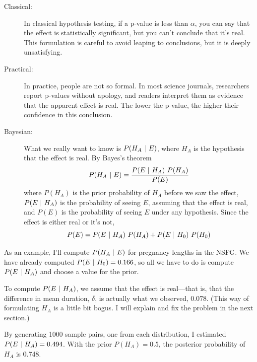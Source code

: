 \documentclass[12pt]{book}
\begin{document}
\begin{description}

\item[Classical:] In classical hypothesis testing, if a p-value
  is less than $\alpha$, you can say that the effect is statistically
  significant, but you can't conclude that it's real.  This
  formulation is careful to avoid leaping to conclusions, but it is
  deeply unsatisfying.

\item[Practical:] In practice, people are not so formal.  In most
  science journals, researchers report p-values without apology, and
  readers interpret them as evidence that the apparent effect is real.
  The lower the p-value, the higher their confidence in this
  conclusion.


\item[Bayesian:] What we really want to know is $P(H_A ~|~ E)$, where
  $H_A$ is the hypothesis that the effect is real.  By Bayes's theorem
  \[ P(H_A ~|~ E) = \frac{P(E ~|~ H_A) ~ P(H_A)}{P(E)} \]
  where $P(H_A)$ is the prior probability of $H_A$ before we saw the
  effect, $P(E ~|~ H_A)$ is the probability of seeing $E$, assuming that
  the effect is real, and $P(E)$ is the probability of seeing $E$
  under any hypothesis.  Since the effect is either real or it's not,
  \[ P(E) = P(E ~|~ H_A) ~ P(H_A) + P(E ~|~ H_0) ~ P(H_0) \]

\end{description}

As an example, I'll compute $P(H_A ~|~ E)$ for pregnancy lengths in the
NSFG.  We have already computed $P(E ~|~ H_0)=0.166$, so all we have to
do is compute $P(E ~|~ H_A)$ and choose a value for the prior.



To compute $P(E ~|~ H_A)$, we assume that the effect is real---that is,
that the difference in mean duration, $\delta$, is actually what we
observed, $0.078$.  (This way of formulating $H_A$ is a little bit
bogus.  I will explain and fix the problem in the next section.)

By generating 1000 sample pairs, one from each
distribution, I estimated $P(E ~|~ H_A) = 0.494$.  With the prior
$P(H_A)=0.5$, the posterior probability of $H_A$ is 0.748.
\end{document}
